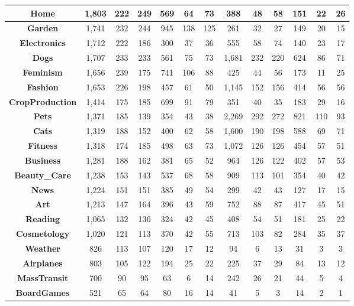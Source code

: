 \begin{table}[t]
{\begin{tabular}{|c||c|c|c||c|c|c||c|c|c||c|c|c|}
\textbf{Home} & 1,803 & 222 & 249 & 569 & 64 & 73 & 388 & 48 & 58 & 151 & 22 & 26\\ \hline
\textbf{Garden} & 1,741 & 232 & 244 & 945 & 138 & 125 & 261 & 32 & 27 & 149 & 20 & 15\\ \hline
\textbf{Electronics} & 1,712 & 222 & 186 & 300 & 37 & 36 & 555 & 58 & 74 & 140 & 23 & 17\\ \hline
\textbf{Dogs} & 1,707 & 233 & 233 & 561 & 75 & 73 & 1,681 & 232 & 220 & 624 & 86 & 71\\ \hline
\textbf{Feminism} & 1,656 & 239 & 175 & 741 & 106 & 88 & 425 & 44 & 56 & 173 & 11 & 25\\ \hline
\textbf{Fashion} & 1,653 & 226 & 198 & 457 & 61 & 50 & 1,145 & 152 & 156 & 414 & 56 & 56\\ \hline
\textbf{CropProduction} & 1,414 & 175 & 185 & 699 & 91 & 79 & 351 & 40 & 35 & 183 & 29 & 16\\ \hline
\textbf{Pets} & 1,371 & 185 & 139 & 354 & 43 & 38 & 2,269 & 292 & 272 & 821 & 110 & 93\\ \hline
\textbf{Cats} & 1,319 & 188 & 152 & 400 & 62 & 58 & 1,600 & 190 & 198 & 588 & 69 & 71\\ \hline
\textbf{Fitness} & 1,318 & 174 & 185 & 498 & 63 & 73 & 1,072 & 126 & 126 & 454 & 57 & 51\\ \hline
\textbf{Business} & 1,281 & 188 & 162 & 381 & 65 & 52 & 964 & 126 & 122 & 402 & 57 & 53\\ \hline
\textbf{Beauty\_Care} & 1,238 & 153 & 143 & 537 & 68 & 58 & 909 & 113 & 101 & 354 & 40 & 42\\ \hline
\textbf{News} & 1,224 & 151 & 151 & 385 & 49 & 54 & 299 & 42 & 43 & 127 & 17 & 15\\ \hline
\textbf{Art} & 1,213 & 147 & 164 & 396 & 43 & 59 & 752 & 88 & 87 & 417 & 45 & 51\\ \hline
\textbf{Reading} & 1,065 & 132 & 136 & 324 & 42 & 45 & 408 & 54 & 51 & 181 & 25 & 22\\ \hline
\textbf{Cosmetology} & 1,020 & 121 & 113 & 370 & 42 & 55 & 713 & 103 & 82 & 284 & 35 & 37\\ \hline
\textbf{Weather} & 826 & 113 & 107 & 120 & 17 & 12 & 94 & 6 & 13 & 31 & 3 & 3\\ \hline
\textbf{Airplanes} & 803 & 105 & 122 & 194 & 25 & 22 & 225 & 37 & 29 & 84 & 13 & 12\\ \hline
\textbf{MassTransit} & 700 & 90 & 95 & 63 & 6 & 14 & 242 & 26 & 21 & 44 & 5 & 4\\ \hline
\textbf{BoardGames} & 521 & 65 & 64 & 80 & 16 & 14 & 41 & 5 & 3 & 14 & 2 & 1\\ \hline

\end{tabular}}
\end{table}
